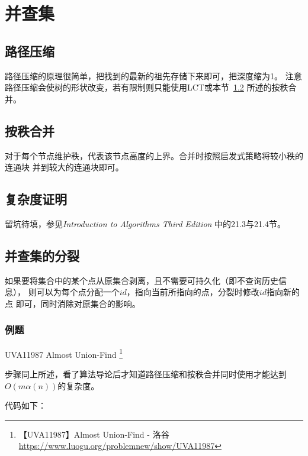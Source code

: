\section{并查集}\label{DSU}
\subsection{路径压缩}
路径压缩的原理很简单，把找到的最新的祖先存储下来即可，把深度缩为1。
注意路径压缩会使树的形状改变，若有限制则只能使用LCT或本节~\ref{RankMerge}
所述的按秩合并。
\subsection{按秩合并}\label{RankMerge}
对于每个节点维护秩，代表该节点高度的上界。合并时按照启发式策略将较小秩的连通块
并到较大的连通块即可。
\subsection{复杂度证明}
留坑待填，参见\emph{Introduction to Algorithms Third Edition}\cite{ITA3}
中的21.3与21.4节。
\subsection{并查集的分裂}
如果要将集合中的某个点从原集合剥离，且不需要可持久化（即不查询历史信息），
则可以为每个点分配一个$id$，指向当前所指向的点，分裂时修改$id$指向新的点
即可，同时消除对原集合的影响。

\subsubsection{例题}

UVA11987 Almost Union-Find \footnote{
    【UVA11987】Almost Union-Find - 洛谷
    \url{https://www.luogu.org/problemnew/show/UVA11987}}

步骤同上所述，看了算法导论后才知道路径压缩和按秩合并同时使用才能达到
$O(m\alpha(n))$的复杂度。

代码如下：

